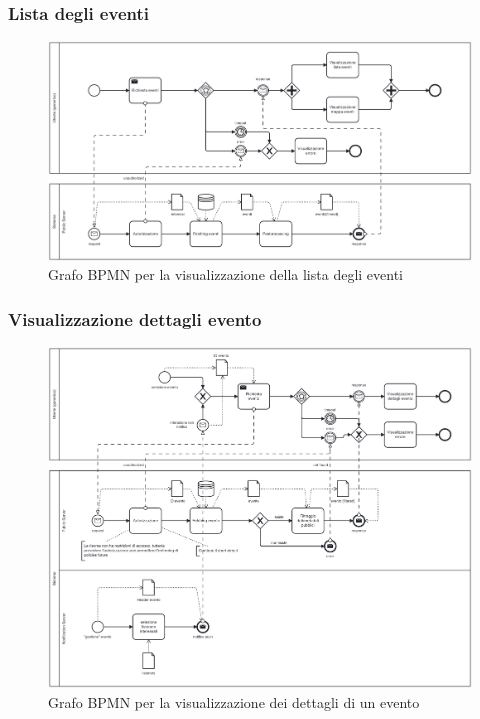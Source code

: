 \documentclass{article}
\begin{document}
\clearpage

\subsubsection{Lista degli eventi}

\begin{figure}[htbp]
    \label{7.1.3}
    \centering
    \includegraphics[width=1\textwidth]{Images/BPMN - list.png}
    \caption{Grafo BPMN per la visualizzazione della lista degli eventi}
\end{figure}

\clearpage

\subsubsection{Visualizzazione dettagli evento}

\begin{figure}[htbp]
    \label{7.1.4}
    \centering
    \includegraphics[width=1\textwidth]{Images/BPMN - details.png}
    \caption{Grafo BPMN per la visualizzazione dei dettagli di un evento}
\end{figure}
\end{document}
